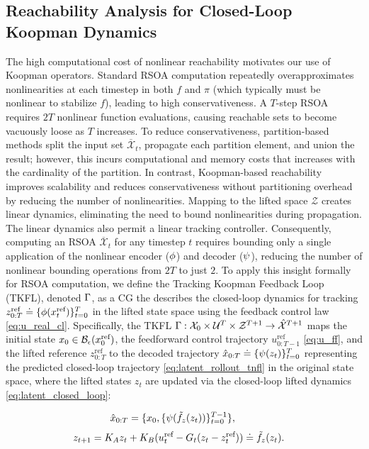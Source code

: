 \subsection{Reachability Analysis for Closed-Loop Koopman Dynamics}\label{sec:reachability}
The high computational cost of nonlinear reachability motivates our use of Koopman operators. Standard RSOA computation repeatedly overapproximates nonlinearities at each timestep in both $f$ and $\pi$ (which typically must be nonlinear to stabilize $f$), leading to high conservativeness. A $T$-step RSOA requires $2T$ nonlinear function evaluations, causing reachable sets to become vacuously loose as $T$ increases. To reduce conservativeness, partition-based methods split the input set $\overline{\mathcal{X}}_t$, propagate each partition element, and union the result; however, this incurs computational and memory costs that increases with the cardinality of the partition. In contrast, Koopman-based reachability improves scalability and reduces conservativeness without partitioning overhead by reducing the number of nonlinearities. Mapping to the lifted space $\mathcal{Z}$ creates linear dynamics, eliminating the need to bound nonlinearities during propagation. The linear dynamics also permit a linear tracking controller. Consequently, computing an RSOA $\overline{\mathcal{X}}_t$ for any timestep $t$ requires bounding only a single application of the nonlinear encoder ($\phi$) and decoder ($\psi$), reducing the number of nonlinear bounding operations from $2T$ to just $2$. 
To apply this insight formally for RSOA computation, we define the Tracking Koopman Feedback Loop (TKFL), denoted $\Gamma$, as a CG the describes the closed-loop dynamics for tracking $z_{0:T}^{\text{ref}} \doteq \{\phi(x_t^{\text{ref}})\}_{t=0}^T$ in the lifted state space using the feedback control law \eqref{eq:u_real_cl}.  Specifically, the TKFL $\Gamma : \mathcal{X}_0 \times \mathcal{U}^T \times \mathcal{Z}^{T+1} \rightarrow \hat{\mathcal{X}}^{T+1}$ maps the initial state $x_0 \in \mathcal{B}_{\epsilon}(x_{0}^{\text{ref}})$, the feedforward control trajectory $u_{0:T-1}^{\text{ref}}$ \eqref{eq:u_ff}, and the lifted reference $z_{0:T}^{\text{ref}}$ to the decoded trajectory $\hat{x}_{0:T} \doteq \{\psi(z_{t})\}_{t=0}^T$ representing the predicted closed-loop trajectory \eqref{eq:latent_rollout_tnfl} in the original state space, where the lifted states $z_t$ are updated via the closed-loop lifted dynamics \eqref{eq:latent_closed_loop}: 

\begin{equation}
\label{eq:latent_rollout_tnfl}
    \hspace{-23pt}\hat{x}_{0:T} = \{x_0, \{\dec (\tilde f_z(z_t))\}_{t=0}^{T-1}\},
\end{equation}
\begin{equation}
\label{eq:latent_closed_loop}
    \hspace{-30pt} z_{t+1} = \ka z_t + \kb (u_t^\textrm{ref} - G_t(z_t - z_t^\textrm{ref})) \doteq \tilde f_z(z_t).\hspace{-20pt}
\end{equation}

